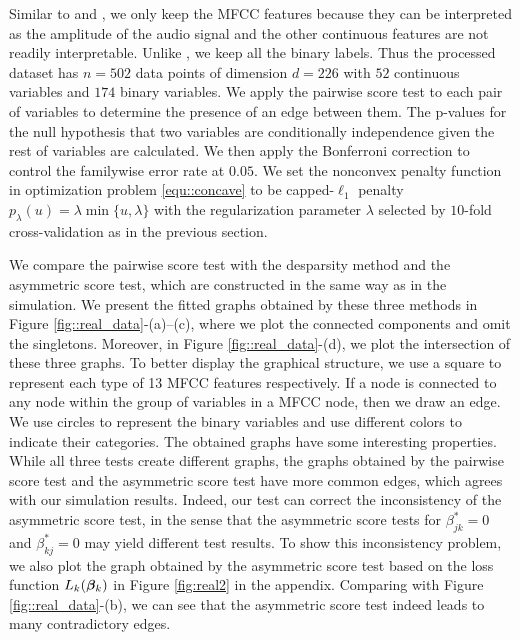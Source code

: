\documentclass[twoside,11pt]{article}
\begin{document}
Similar to \cite{turnbull2008semantic} and \cite{cheng2013high}, we only keep the MFCC features because they can be interpreted as the amplitude of the audio signal and the other continuous features are not readily interpretable. Unlike \cite{cheng2013high}, we keep all the binary labels. Thus the processed dataset has $n=502$ data points of dimension $d=226$ with $52$ continuous variables and $174$ binary variables.   We apply the pairwise score test to each pair of variables to determine the presence of an edge between them.  The p-values for the null hypothesis that two variables are conditionally independence given the rest of variables are calculated.  
We then apply the Bonferroni  correction to control the familywise error rate at $0.05$.
We set the nonconvex penalty function in optimization problem \eqref{equ::concave} to be capped-$\ell_1$ penalty $p_{\lambda}(u) = \lambda \min\{u,\lambda\}$ with the regularization parameter $\lambda$ selected by $10$-fold cross-validation as in the previous section. 

We compare the pairwise score test with the desparsity  method and the asymmetric score test, which are constructed in the same way as in the simulation. 
We present the fitted graphs obtained by these three methods  in Figure \ref{fig::real_data}-(a)--(c),  where we plot the connected components and omit the singletons. Moreover, in  Figure \ref{fig::real_data}-(d), we plot the intersection of these three graphs.
To better display the graphical structure, we use a square to represent each type of 13 MFCC features respectively. If a node is connected to any node within the group of variables in a MFCC node, then we draw an edge.  We use circles to represent the binary variables and use different colors to indicate their categories. 
The obtained graphs have some interesting properties.  
While all three tests create different graphs, the graphs  obtained by  the pairwise score  test and  the asymmetric score test  have more common edges, which agrees with our simulation results. Indeed, our test can correct the  inconsistency of the asymmetric score test, in the sense that the asymmetric score tests for $\beta_{jk}^*=0$ and $\beta_{kj}^*=0$ may yield different test results. To show this inconsistency problem, we also plot the graph obtained by the asymmetric score test based on the loss function $L_k(\bm{\beta}_k)$ in Figure \ref{fig:real2} in the appendix. Comparing with Figure \ref{fig::real_data}-(b), we can see that the asymmetric score test  indeed leads to many contradictory edges.  
\end{document}
